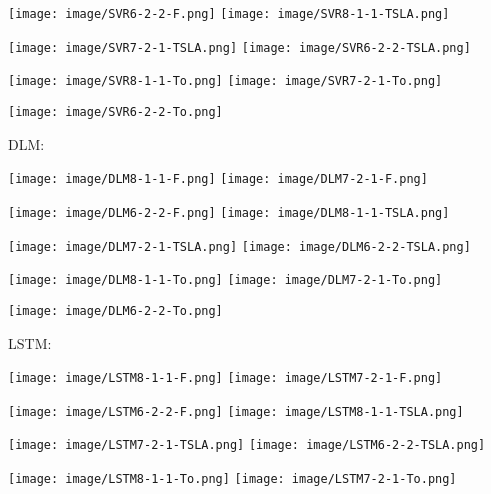\documentclass{ieeeojies}
\begin{document}
    \texttt{[image: image/SVR6-2-2-F.png]}
    \hspace{0.1cm}\texttt{[image: image/SVR8-1-1-TSLA.png]}
    
    \texttt{[image: image/SVR7-2-1-TSLA.png]}
    \hspace{0.1cm}\texttt{[image: image/SVR6-2-2-TSLA.png]}
    
    \texttt{[image: image/SVR8-1-1-To.png]}
    \hspace{0.1cm}\texttt{[image: image/SVR7-2-1-To.png]}
    
    \texttt{[image: image/SVR6-2-2-To.png]}

DLM:

    \texttt{[image: image/DLM8-1-1-F.png]}
    \hspace{0.25cm}\texttt{[image: image/DLM7-2-1-F.png]}
    
    \texttt{[image: image/DLM6-2-2-F.png]}
    \hspace{0.13cm}\texttt{[image: image/DLM8-1-1-TSLA.png]}
    
    \texttt{[image: image/DLM7-2-1-TSLA.png]}
    \hspace{0.22cm}\texttt{[image: image/DLM6-2-2-TSLA.png]}
    
    \texttt{[image: image/DLM8-1-1-To.png]}
    \hspace{0.2cm}\texttt{[image: image/DLM7-2-1-To.png]}
    
    \texttt{[image: image/DLM6-2-2-To.png]}

LSTM:

    \texttt{[image: image/LSTM8-1-1-F.png]}
    \hspace{0.2cm}\texttt{[image: image/LSTM7-2-1-F.png]}
    
    \texttt{[image: image/LSTM6-2-2-F.png]}
    \hspace{0.2cm}\texttt{[image: image/LSTM8-1-1-TSLA.png]}
    
    \texttt{[image: image/LSTM7-2-1-TSLA.png]}
    \hspace{0.22cm}\texttt{[image: image/LSTM6-2-2-TSLA.png]}
    
    \texttt{[image: image/LSTM8-1-1-To.png]}
    \hspace{0.2cm}\texttt{[image: image/LSTM7-2-1-To.png]}
    
\end{document}
